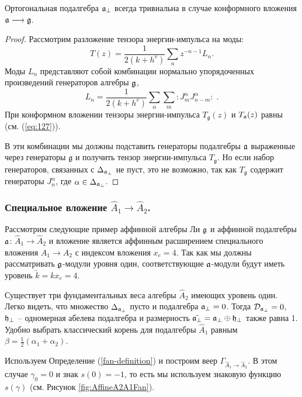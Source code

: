 \begin{mynote} Ортогональная подалгебра  $\mathfrak{a}_{\perp}$ всегда тривиальна в случае конформного вложения $\mathfrak{a}\longrightarrow \mathfrak{g}$.
\begin{proof}
Рассмотрим разложение тензора энергии-импульса на моды:
\begin{equation*}
\label{eq:47}
  T(z)=\frac{1}{2(k+h^v)}\sum_n z^{-n-1}L_n.
\end{equation*}
Моды $L_n$ представляют собой комбинации нормально упорядоченных произведений генераторов алгебры $\mathfrak{g}$,
\begin{equation*}
\label{eq:48}
  L_n=\frac{1}{2(k+h^v)}\sum_{\alpha}\sum_m:J^{\alpha}_m J^{\alpha}_{n-m}: \; .
\end{equation*}
При конформном вложении тензоры энергии-импульса  $T_{\mathfrak{g}}(z)$ и $T_{\mathfrak{a}}(z)$ равны (см. (\ref{eq:127})).

В эти комбинации мы должны подставить генераторы подалгебры $\mathfrak{a}$ выраженные через генераторы $\mathfrak{g}$ и получить тензор энергии-импульса $T_{\mathfrak{g}}$. Но если набор генераторов, связанных с  $\Delta_{\mathfrak{a}_{\perp}}$ не пуст, это не возможно, так как  $T_{\mathfrak{g}}$ содержит генераторы $J^{\alpha}_n$, где $\alpha\in \Delta_{\mathfrak{a}_{\perp}}$.
\end{proof}
\end{mynote}



\subsubsection{Специальное вложение $\hat{A}_1\rightarrow\hat{A}_2$.}
\label{sec:spec-embedd-hata_1s}
Рассмотрим следующие пример аффинной алгебры Ли $\mathfrak{g}$ и аффинной подалгебры $\mathfrak{a}$:
$\hat{A}_1 \rightarrow \hat{A}_2$ и вложение является аффинным расширением специального вложения $A_1 \rightarrow A_2$ с индексом вложения $x_e=4$. Так как мы должны рассматривать $\mathfrak{g}$-модули уровня один, соответствующие  $\mathfrak{a}$-модули будут иметь уровень $\tilde{k}=kx_e=4$.

Существует три фундаментальных веса алгебры  $\hat{A}_2$ имеющих уровень один. 
Легко видеть, что множество $\Delta_{ \mathfrak{a}_{\perp} }$ пусто и подалгебра $\mathfrak{a}_{\perp}=0$. Тогда ${\cal D}_{\mathfrak{a}_{\perp}}=0$, $\mathfrak{h}_{\perp}$ -- одномерная абелева подалгебра и размерность $\tilde{\mathfrak{a}_{\perp}}=\mathfrak{a}_{\perp}\oplus \mathfrak{h}_{\perp}$ также равна 1. Удобно выбрать классический корень для подалгебры $\hat{A}_1$ равным $\beta=\frac{1}{2}(\alpha_1+\alpha_2)$.

Используем Определение (\ref{fan-definition}) и построим веер $\Gamma_{\hat A_1\to\hat A_2}$. В этом случае $\gamma_0 =0$ и знак  $s\left( 0 \right)=-1$, то есть мы используем знаковую функцию $s(\gamma)$ (см. Рисунок \ref{fig:AffineA2A1Fan}).


